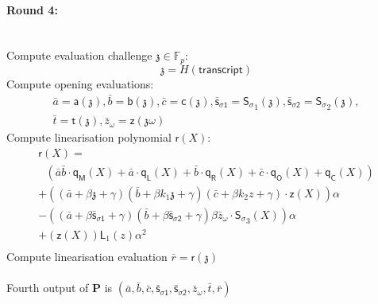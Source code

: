 \documentclass[11pt]{article} %
\newcommand{\F}{\ensuremath{\mathbb F}\xspace}
\newcommand{\chalpoint}{\ensuremath{\mathfrak{z}}\xspace}
\newcommand{\prv}{\ensuremath{\mathsf{\mathbf{P}}}\xspace}
\newcommand{\sigpoly}{\ensuremath{\mathsf{S_{\sigma}}}\xspace}
\newcommand{\sigpolyevala}{\ensuremath{\mathsf{\bar{s}_{\sigma1}}}\xspace}
\newcommand{\sigpolyevalb}{\ensuremath{\mathsf{\bar{s}_{\sigma2}}}\xspace}
\newcommand{\lpoly}{\ensuremath{\mathsf{a}}\xspace}
\newcommand{\rpoly}{\ensuremath{\mathsf{b}}\xspace}
\newcommand{\opoly}{\ensuremath{\mathsf{c}}\xspace}
\newcommand{\idpermpoly}{\ensuremath{\mathsf{z}}\xspace}
\newcommand{\lagrangepoly}{\ensuremath{\mathsf{L}}\xspace}
\newcommand{\snark}{\ensuremath{\mathsf{snark(\lambda)}}\xspace}
\newcommand{\Prove}{\mathcal{P}}
\newcommand{\Psnark}{\prv}%
\newcommand{\transcript}{\ensuremath{\mathsf{transcript}}\xspace}
\begin{document}
	\paragraph{\textbf{Round 4:}} \ \\Compute evaluation challenge $\chalpoint \in \F_p:$ \[ \chalpoint = H(\transcript)\]
	Compute opening evaluations:
	$$
	\begin{array}{c}
	\bar{a} = \lpoly(\chalpoint), \bar{b} = \rpoly(\chalpoint), \bar{c} = \opoly(\chalpoint), \sigpolyevala = \sigpoly_1(\chalpoint), \sigpolyevalb = \sigpoly_2(\chalpoint), \\
	\bar{t} = \mathsf{t}(\chalpoint), \bar{z}_\omega = \idpermpoly(\chalpoint \omega)
	\end{array}
	$$
	Compute linearisation polynomial $\mathsf{r}(X):$
	$$
	\begin{array}{l}
	\mathsf{r}(X) = \\
	\ \ \ \left( \bar{a} \bar{b} \cdot \mathsf{q_M}(X) + \bar{a} \cdot \mathsf{q_L}(X) + \bar{b} \cdot \mathsf{q_R}(X) + \bar{c} \cdot \mathsf{q_O}(X) + \mathsf{q_C}(X) \right) \\
	+ \left( (\bar{a} + \beta \chalpoint + \gamma)(\bar{b} + \beta k_1 \chalpoint + \gamma)(\bar{c} + \beta k_2 z + \gamma) \cdot \idpermpoly(X) \right)\alpha \\
	- \left( (\bar{a} + \beta \sigpolyevala + \gamma)(\bar{b} + \beta \sigpolyevalb + \gamma)\beta \bar{z}_\omega \cdot \sigpoly_3(X)\right)\alpha \\
	+ \left( \idpermpoly(X) \right) \lagrangepoly_1(z)\alpha^2 \\
	\end{array}
	$$
	Compute linearisation evaluation $\bar{r} = \mathsf{r}(\chalpoint)$ \\ \\
	Fourth output of $\Psnark$ is $(\bar{a}, \bar{b}, \bar{c}, \sigpolyevala, \sigpolyevalb, \bar{z}_\omega, \bar{t}, \bar{r})$ \\ \\
	\noindent
\end{document}
